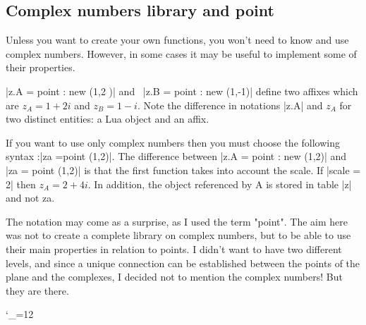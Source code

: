 \subsection{Complex numbers library and point} %
\label{sub:complex_numbers}

Unless you want to create your own functions, you won't need to know and use complex numbers. However, in some cases it may be useful to implement some of their properties.


|z.A =  point : new (1,2 )| and \ |z.B = point : new (1,-1)| define two affixes which are $z_A = 1+2i$ and $z_B = 1-i$. Note the difference in notations |z.A| and $z_A$ for two distinct entities: a Lua object and an affix. 

\vspace{1em}
If you want to use only complex numbers then you must choose the following syntax :|za =point (1,2)|.
The difference between |z.A = point : new (1,2)| and |za = point (1,2)| is that the first function takes into account the scale. If |scale = 2| then $z_A = 2+4i$. In addition, the object referenced by A is stored in table |z| and not za.

 The notation may come as a surprise, as I used the term "point". The aim here was not to create a complete library on complex numbers, but to be able to use their main properties in relation to points. I didn't want to have two different levels, and since a unique connection can be established between the points of the plane and the complexes, I decided not to mention the complex numbers! But they are there.


\bgroup
\catcode`_=12
\small

